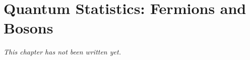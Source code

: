 \chapter{Quantum Statistics: Fermions and Bosons}\label{ch:b3:quantum-statistics}


\emph{This chapter has not been written yet.}

